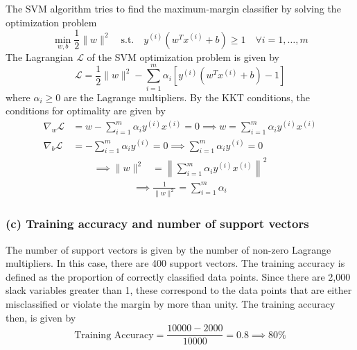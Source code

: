 The SVM algorithm tries to find the maximum-margin classifier by solving the optimization problem
\begin{equation*}
    \min_{w, b} \frac{1}{2} \| w \|^{2}
    \quad \text{s.t.} \quad
    y^{(i)} \left( w^{T} x^{(i)} + b \right) \geq 1
    \quad
    \forall i = 1, \ldots, m
\end{equation*}
The Lagrangian \( \mathcal{L} \) of the SVM optimization problem is given by
\begin{equation*}
    \mathcal{L} = \frac{1}{2} \| w \|^{2} - \sum_{i=1}^{m} \alpha_{i} \left[ y^{(i)} \left( w^{T} x^{(i)} + b \right) - 1 \right]
\end{equation*}
where \( \alpha_{i} \geq 0 \) are the Lagrange multipliers.
By the KKT conditions, the conditions for optimality are given by
\begin{align*}
    \nabla_{w} \mathcal{L}
     & =
    w - \sum_{i=1}^{m} \alpha_{i} y^{(i)} x^{(i)} = 0
    \implies
    w = \sum_{i=1}^{m} \alpha_{i} y^{(i)} x^{(i)}
    \\
    \nabla_{b} \mathcal{L}
     & =
    - \sum_{i=1}^{m} \alpha_{i} y^{(i)} = 0
    \implies
    \sum_{i=1}^{m} \alpha_{i} y^{(i)} = 0
\end{align*}
\begin{align*}
    \implies
    \lVert w \rVert^{2}
     & =
    \left\lVert \sum_{i=1}^{m} \alpha_{i} y^{(i)} x^{(i)} \right\rVert^{2}
\end{align*}
\begin{align*}
    \implies
    \frac{1}{\lVert w \rVert^{2}}
    =
    \sum_{i=1}^{m} \alpha_{i}
\end{align*}

\subsubsection*{(c) Training accuracy and number of support vectors}

The number of support vectors is given by the number of non-zero Lagrange multipliers.
In this case, there are 400 support vectors.
The training accuracy is defined as the proportion of correctly classified data points.
Since there are 2,000 slack variables greater than 1, these correspond to the data points that are either misclassified or violate the margin by more than unity.
The training accuracy then, is given by
\begin{equation*}
    \text{Training Accuracy} = \frac{10000 - 2000}{10000} = 0.8
    \implies
    80\%
\end{equation*}
